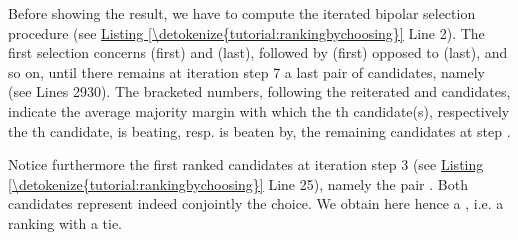 \documentclass[a4paper,12pt,english]{sphinxhowto}
\begin{document}
\begin{sphinxVerbatim}[commandchars=\\\{\},numbers=left,firstnumber=1,stepnumber=1]
\end{sphinxVerbatim}

Before showing the  result, we have to compute the iterated bipolar selection procedure (see \hyperref[\detokenize{tutorial:rankingbychoosing}]{Listing \ref{\detokenize{tutorial:rankingbychoosing}}} Line 2). The first selection concerns  (first) and  (last), followed by  (first) opposed to  (last), and so on, until there remains at iteration step 7 a last pair of candidates, namely \sphinxstyleemphasis{{[}a04, a12{]}} (see Lines 29\sphinxhyphen{}30). The bracketed numbers, following the reiterated  and  candidates, indicate the average majority margin with which the \sphinxhyphen{}th  candidate(s), respectively the \sphinxhyphen{}th  candidate, is beating, resp. is beaten by, the remaining candidates at step .

Notice furthermore the first ranked candidates at iteration step 3 (see \hyperref[\detokenize{tutorial:rankingbychoosing}]{Listing \ref{\detokenize{tutorial:rankingbychoosing}}} Line 25), namely the pair \sphinxstyleemphasis{{[}a07, a08{]}}. Both candidates represent indeed conjointly the  choice. We obtain here hence a , i.e. a ranking with a tie.
\end{document}

